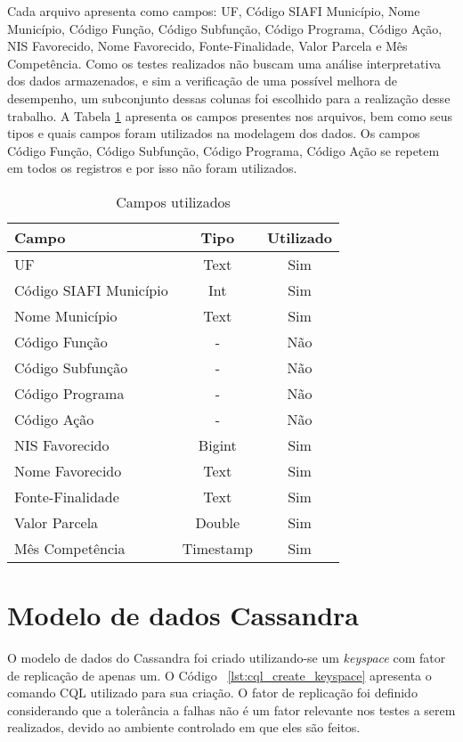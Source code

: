 Cada arquivo apresenta como campos: UF, Código SIAFI Município, Nome Município, Código Função, Código Subfunção, Código Programa, Código Ação, NIS Favorecido, Nome Favorecido, Fonte-Finalidade, Valor Parcela e Mês Competência. Como os testes realizados não buscam uma análise interpretativa dos dados armazenados, e sim a verificação de uma possível melhora de desempenho, um subconjunto dessas colunas foi escolhido para a realização desse trabalho. A Tabela \ref{tab:colunas} apresenta os campos presentes nos arquivos, bem como seus tipos e quais campos foram utilizados na modelagem dos dados. Os campos Código Função, Código Subfunção, Código Programa, Código Ação se repetem em todos os registros e por isso não foram utilizados.

\begin{table}[]
	\centering
	\caption{Campos utilizados}
	\label{tab:colunas}
	\begin{tabular}{|l|c|c|}
		\hline
		\textbf{Campo}         & \textbf{Tipo} & \textbf{Utilizado} \\ \hline
		UF                     & Text          & Sim                \\ \hline
		Código SIAFI Município & Int           & Sim                \\ \hline
		Nome Município         & Text          & Sim                \\ \hline
		Código Função          & -             & Não                \\ \hline
		Código Subfunção       & -             & Não                \\ \hline
		Código Programa        & -             & Não                \\ \hline
		Código Ação            & -             & Não                \\ \hline
		NIS Favorecido         & Bigint        & Sim                \\ \hline
		Nome Favorecido        & Text          & Sim                \\ \hline
		Fonte-Finalidade       & Text          & Sim                \\ \hline
		Valor Parcela          & Double        & Sim                \\ \hline
		Mês Competência        & Timestamp     & Sim                \\ \hline
	\end{tabular}
\end{table}

\section{Modelo de dados Cassandra}
O modelo de dados do Cassandra foi criado utilizando-se um \emph{keyspace} com fator de replicação de apenas um. O Código ~\ref{lst:cql_create_keyspace} apresenta o comando CQL utilizado para sua criação. O fator de replicação foi definido considerando que a tolerância a falhas não é um fator relevante nos testes a serem realizados, devido ao ambiente controlado em que eles são feitos.

